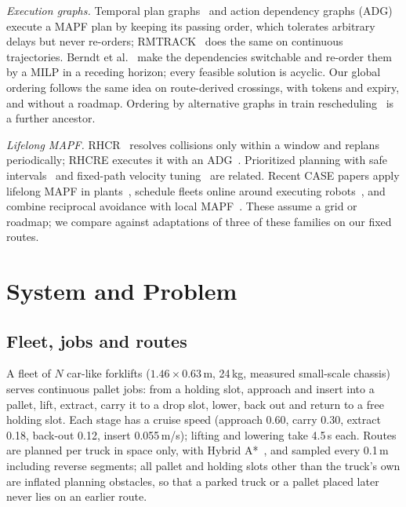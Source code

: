 \documentclass[conference]{IEEEtran}
\begin{document}
\emph{Execution graphs.} Temporal plan graphs~\cite{honig2016} and action
dependency graphs (ADG)~\cite{honig2019} execute a MAPF plan by keeping its
passing order, which tolerates arbitrary delays but never re-orders;
RMTRACK~\cite{cap2016} does the same on continuous trajectories. Berndt et
al.~\cite{berndt2024} make the dependencies switchable and re-order them by a
MILP in a receding horizon; every feasible solution is acyclic. Our global
ordering follows the same idea on route-derived crossings, with tokens and
expiry, and without a roadmap. Ordering by alternative graphs in train
rescheduling~\cite{mascis2002,dariano2007} is a further ancestor.

\emph{Lifelong MAPF.} RHCR~\cite{li2021rhcr} resolves collisions only within a
window and replans periodically; RHCRE executes it with an
ADG~\cite{varambally2022}. Prioritized planning with safe
intervals~\cite{phillips2011,cap2015} and fixed-path velocity
tuning~\cite{peng2005} are related. Recent CASE papers apply lifelong MAPF in
plants~\cite{bonetti2024,maoudj2024}, schedule fleets online around executing
robots~\cite{popolizio2024}, and combine reciprocal avoidance with local
MAPF~\cite{dergachev2021}. These assume a grid or roadmap; we compare against
adaptations of three of these families on our fixed routes.

\section{System and Problem}
\label{sec:problem}

\subsection{Fleet, jobs and routes}
A fleet of $N$ car-like forklifts ($1.46\times0.63$\,m, 24\,kg, measured
small-scale chassis) serves
continuous pallet jobs: from a holding slot, approach and insert into a pallet,
lift, extract, carry it to a drop slot, lower, back out and return to a free
holding slot. Each stage has a cruise speed (approach 0.60, carry 0.30,
extract 0.18, back-out 0.12, insert 0.055\,m/s); lifting and lowering take
4.5\,s each. Routes are planned per truck in space only, with Hybrid
A*~\cite{dolgov2010}, and sampled every 0.1\,m including reverse segments;
all pallet and holding slots other than the truck's own are inflated
planning obstacles, so that a parked truck or a pallet placed later never lies
on an earlier route.
\end{document}
